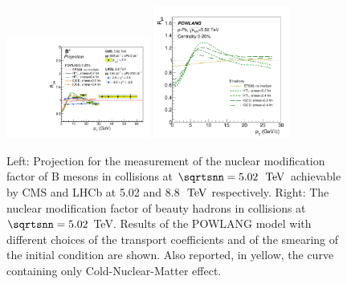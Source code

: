 \begin{figure}[ht]
\centering
\includegraphics[trim=0 0 13cm 0,clip,width=0.42\textwidth]{hf/figures/cRpA_lumiTG_2000_Bp_LHCb.pdf}
\includegraphics[width=0.4\textwidth]{hf/figures/Beauty-RpPb5TeV-HTLvsLat.pdf}
\caption{Left: Projection for the measurement of the nuclear modification factor of B mesons in \pPb collisions at $\sqrtsnn=5.02~\UTeV$ achievable by CMS and LHCb at 5.02 and 8.8 $~\text{TeV}$ respectively. 
Right: The nuclear modification factor of beauty hadrons in \pPb collisions at $\sqrtsnn=5.02$ TeV. Results of the POWLANG model with different choices of the transport coefficients and of the smearing of the initial condition are shown. Also reported, in yellow, the curve containing only Cold-Nuclear-Matter effect.}
\label{fig:POWLANG-small1}
\end{figure}
